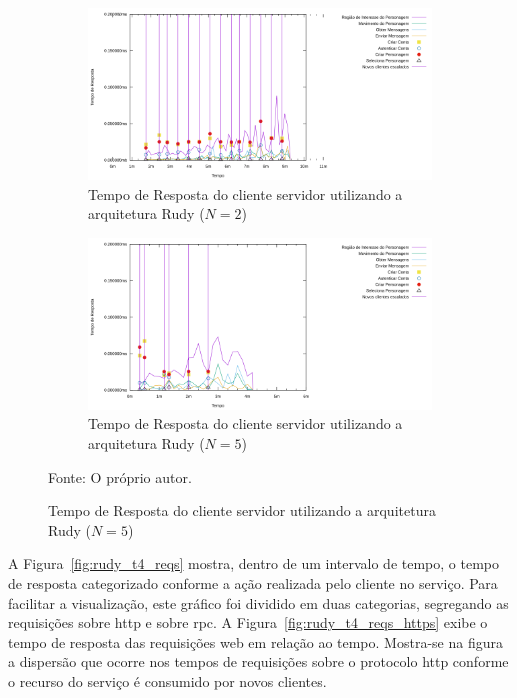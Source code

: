 \begin{figure}[htb!]
    \caption{Tempo de Resposta do cliente servidor utilizando a arquitetura Rudy ($N=2$ e $N=5$)}
    \centering
    \begin{subfigure}{1.0\textwidth}
      \centering
      \includegraphics[width=.9\textwidth]{metricas_rudy_t5/rudyc.png}
      \caption{Tempo de Resposta do cliente servidor utilizando a arquitetura Rudy ($N=2$)}
      \label{fig:rudy_t5_reqs}
    \end{subfigure}


    \begin{subfigure}{1.0\textwidth}
      \centering
      \includegraphics[width=.9\textwidth]{metricas_rudy_t6/rudyc.png}
      \caption{Tempo de Resposta do cliente servidor utilizando a arquitetura Rudy ($N=5$)}
      \label{fig:rudy_t6_reqs}
    \end{subfigure}
    \label{fig:rudy_t56_reqs}

    Fonte: O próprio autor.
\end{figure}

A Figura~\ref{fig:rudy_t4_reqs} mostra, dentro de um intervalo de tempo, o tempo de resposta categorizado conforme a ação realizada pelo cliente no serviço.
%
Para facilitar a visualização, este gráfico foi dividido em duas categorias, segregando as requisições sobre \ac{http} e sobre \ac{rpc}.
%
A Figura~\ref{fig:rudy_t4_reqs_https} exibe o tempo de resposta das requisições web em relação ao tempo.
%
Mostra-se na figura a dispersão que ocorre nos tempos de requisições sobre o protocolo \ac{http} conforme o recurso do serviço é consumido por novos clientes.
 


